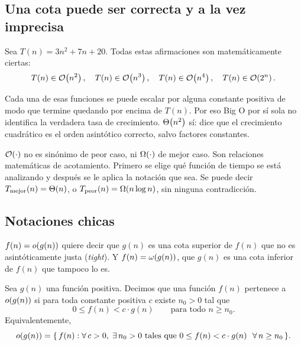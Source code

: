 \documentclass[11pt,letterpaper]{article}
\begin{document}

\subsection*{Una cota puede ser correcta y a la vez imprecisa}

Sea $T(n) = 3n^2 + 7n + 20$. Todas estas afirmaciones son
matemáticamente ciertas:
\[
    T(n) \in \mathcal{O}\!\left(n^2\right), \quad
    T(n) \in \mathcal{O}\!\left(n^3\right), \quad
    T(n) \in \mathcal{O}\!\left(n^4\right), \quad
    T(n) \in \mathcal{O}\!\left(2^n\right) .
\]

Cada una de esas funciones se puede escalar por alguna constante
positiva de modo que termine quedando por encima de $T(n)$. Por eso
Big O por sí sola no identifica la verdadera tasa de crecimiento.
$\Theta\!\left(n^2\right)$ sí: dice que el crecimiento cuadrático es el orden
asintótico correcto, salvo factores constantes.

\begin{ojo}
    $\mathcal{O}\!\left(\cdot\right)$ no es sinónimo de peor caso, ni $\Omega\!\left(\cdot\right)$ de
    mejor caso. Son relaciones matemáticas de acotamiento. Primero se
    elige qué función de tiempo se está analizando y después se le
    aplica la notación que sea. Se puede decir
    $T_{\text{mejor}}(n) = \Theta\!\left(n\right)$, o
    $T_{\text{peor}}(n) = \Omega\!\left(n \log n\right)$, sin ninguna contradicción.
\end{ojo}


\subsection*{Notaciones chicas}

$f(n) = o\!\left(g(n)\right)$ quiere decir que $g(n)$ es una cota superior de
$f(n)$ que no es asintóticamente justa (\textit{tight}). Y
$f(n) = \omega\!\left(g(n)\right)$, que $g(n)$ es una cota inferior de $f(n)$ que
tampoco lo es.

\begin{definicion}
  Sea $g(n)$ una función positiva. Decimos que una función $f(n)$
  pertenece a $o\!\left(g(n)\right)$ si para toda constante positiva $c$ existe
  $n_0 > 0$ tal que
  \[
    0 \leq f(n) < c \cdot g(n) \qquad \text{para todo } n \geq n_0 .
  \]
  Equivalentemente,
  \[
    o\!\left(g(n)\right) = \{\, f(n) : \forall\, c > 0,\; \exists\, n_0 > 0
    \ \text{tales que}\ 0 \leq f(n) < c \cdot g(n)
    \ \ \forall\, n \geq n_0 \,\}.
  \]
\end{definicion}
\end{document}
